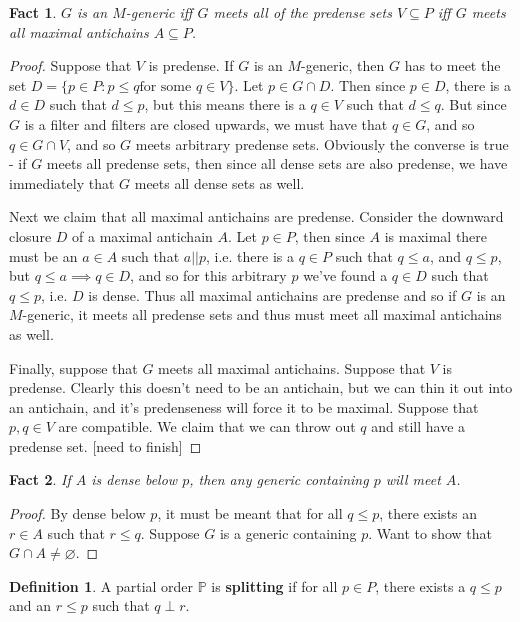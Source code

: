 \documentclass{article}
\theoremstyle{definition}
\newtheorem{definition}{Definition}[section]
\theoremstyle{plain}
\theoremstyle{theorem}
\newtheorem{fact}{Fact}[section]
\begin{document}
\begin{fact}
	$G$ is an $M$-generic iff $G$ meets all of the predense sets $V \subseteq P$ iff $G$ meets all maximal antichains $A \subseteq P$. 
\end{fact}
\begin{proof}
	Suppose that $V$ is predense. If $G$ is an $M$-generic, then $G$ has to meet the set $D = \{p \in P: p \leq q \textrm{for some } q \in V\}$. Let $p \in G \cap D$. Then since $p \in D$, there is a $d \in D$ such that $d \leq p$, but this means there is a $q \in V$ such that $d \leq q$. But since $G$ is a filter and filters are closed upwards, we must have that $q \in G$, and so $q \in G \cap V$, and so $G$ meets arbitrary predense sets. Obviously the converse is true - if $G$ meets all predense sets, then since all dense sets are also predense, we have immediately that $G$ meets all dense sets as well. \par
	Next we claim that all maximal antichains are predense. Consider the downward closure $D$ of a maximal antichain $A$. Let $p \in P$, then since $A$ is maximal there must be an $a \in A$ such that $a || p$, i.e. there is a $q \in P$ such that $q \leq a$, and $q \leq p$, but $q \leq a \implies q \in D$, and so for this arbitrary $p$ we've found a $q \in D$ such that $q \leq p$, i.e. $D$ is dense. Thus all maximal antichains are predense and so if $G$ is an $M$-generic, it meets all predense sets and thus must meet all maximal antichains as well. \par 
	Finally, suppose that $G$ meets all maximal antichains. Suppose that $V$ is predense. Clearly this doesn't need to be an antichain, but we can thin it out into an antichain, and it's predenseness will force it to be maximal. Suppose that $p,q \in V$ are compatible. We claim that we can throw out $q$ and still have a predense set. [need to finish]
\end{proof}
\begin{fact}
	If $A$ is dense below $p$, then any generic containing $p$ will meet $A$. 
\end{fact}
\begin{proof}
	By dense below $p$, it must be meant that for all $q \leq p$, there exists an $r \in A$ such that $r \leq q$. Suppose $G$ is a generic containing $p$. Want to show that $G \cap A \neq \varnothing$. 
\end{proof}
\begin{definition}
	A partial order $\mathbb{P}$ is \textbf{splitting} if for all $p \in P$, there exists a $q \leq p$ and an $r \leq p$ such that $q \perp r$. 
\end{definition}
\end{document}
